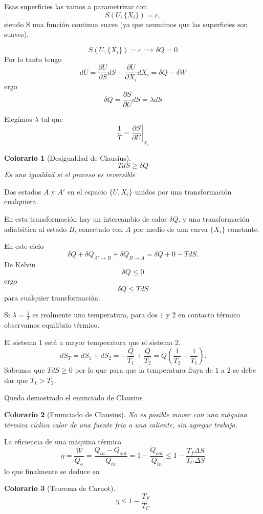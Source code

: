 \documentclass{book}
\numberwithin{equation}{section} %
\newtheorem{collorary}{Colorario}[chapter]
\begin{document}
Esas superficies las vamos a parametrizar con \[S(U,\{X_i\}) = c,\] siendo S una función continua suave (ya que asumimos que las superficies son suaves).

\[S(U,\{X_i\}) = c \implies \delta Q = 0\]
Por lo tanto tengo
\[dU = \frac{\partial U}{\partial S} dS + \frac{\partial U}{\partial X_i} dX_i = \delta Q - \delta W\]
ergo
\begin{equation}
\delta Q = \frac{\partial S}{\partial U} dS = \lambda dS
\end{equation}

Elegimos $\lambda$ tal que
\begin{equation}
\frac{1}{T} = \left.\frac{\partial S}{\partial U}\right|_{X_i}
\label{eq:temperatura_def}
\end{equation}

\begin{collorary}[Desigualdad de Clausius]
\begin{equation}
T dS \geq \delta Q
\end{equation}
Es una igualdad si el proceso es reversible
\end{collorary}

Dos estados $A$ y $A'$ en el espacio $\{U,X_i\}$ unidos por una transformación cualquiera.

En esta transformación hay un intercambio de calor $\delta Q$, y una transformación adiabática al estado $B$, conectado con $A$ por medio de una curva $\{X_i\}$ constante.

En este ciclo
\[\delta Q + \delta Q_{A' \to B} + \delta Q_{B \to A} = \delta Q + 0 - T dS.\]
De Kelvin 
\[ \delta Q \leq 0 \]
ergo
\[\delta Q \leq T dS\]
para cualquier transformación.

Si $\lambda = \frac{1}{T}$ es realmente una temperatura, para dos $1$ y $2$ en contacto térmico observamos equilibrio térmico.

El sistema $1$ está a mayor temperatura que el sistema $2$.
\[dS_{T} = dS_1 + dS_2 = -\frac{Q}{T_1} + \frac{Q}{T_2} = Q \left(\frac{1}{T_2} - \frac{1}{T_1}\right).\]
Sabemos que $T dS \geq 0$ por lo que para que la temperatura fluya de $1$ a $2$ se debe dar que $T_1 > T_2$.

Queda demostrado el enunciado de Clausius
\begin{collorary}[Enunciado de Clausius]
No es posible mover con una máquina térmica cíclica calor de una fuente fría a una caliente, sin agregar trabajo.
\end{collorary}


La eficiencia de una máquina térmica
\[\eta = \frac{W}{Q_{\in}} = \frac{Q_{in} - Q_{out}}{Q_{in}} = 1 - \frac{Q_{out}}{Q_{in}} \leq 1 - \frac{T_{f} \Delta S}{T_C \Delta S}\]
lo que finalmente se deduce en
\begin{collorary}[Teorema de Carnot]
\begin{equation}
\eta \leq 1 - \frac{T_F}{T_C}
\end{equation}
\end{collorary}
\end{document}
